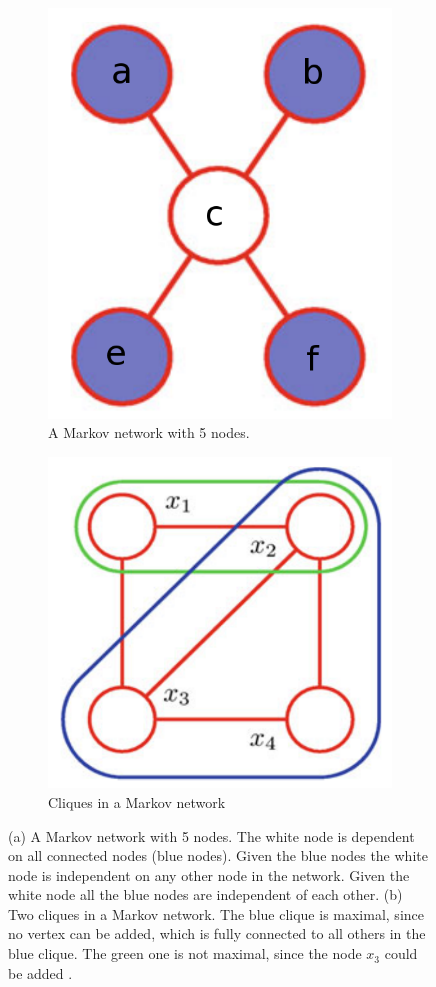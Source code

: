 \begin{figure}
	\centering
	\begin{subfigure}[t]{.5\textwidth}
  		\centering
  		\includegraphics[width=.5\linewidth]{imgs/markovnet1.png}
  		\caption{A Markov network with 5 nodes.}
  		\label{fig:markovnet1}
	\end{subfigure}%
	\begin{subfigure}[t]{.5\textwidth}
  		\centering
  		\includegraphics[width=.5\linewidth]{imgs/markovnet2.png}
  		\caption{Cliques in a Markov network}
  		\label{fig:markovnet2}
	\end{subfigure}
	\caption[A Markov network with 5 nodes.]{(a) A Markov network with 5 nodes. The white node is dependent on all connected nodes (blue nodes). Given the blue nodes the white node is independent on any other node in the network. Given the white node all the blue nodes are independent of each other. (b) Two cliques in a Markov network. The blue clique is maximal, since no vertex can be added, which is fully connected to all others in the blue clique. The green one is not maximal, since the node $x_3$ could be added \cite{bishop2013pattern}.}
	\label{fig:markovnet}
\end{figure}


